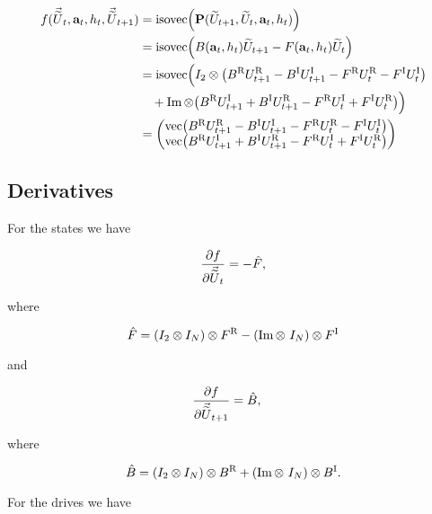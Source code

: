 \documentclass{article}
\newcommand{\isoU}{\widetilde{U}}
\newcommand{\isovecU}{\vec{\widetilde{U}}}
\newcommand{\isovec}{\text{isovec}}
\newcommand{\BR}{B^{\text{R}}}
\newcommand{\BI}{B^{\text{I}}}
\newcommand{\FR}{F^{\text{R}}}
\newcommand{\FI}{F^{\text{I}}}
\newcommand{\UR}{U^{\text{R}}}
\newcommand{\UI}{U^{\text{I}}}
\begin{document}
\begin{align*}
  f(\isovecU_{t}, \vb{a}_t, h_t, \isovecU_{t+1}) &= \isovec\qty(\vb{P}(\isoU_{t+1}, \isoU_t, \vb{a}_t, h_t)) \\ 
  &= \isovec\qty(B(\vb{a}_t, h_t) \isoU_{t+1} - F(\vb{a}_t, h_t) \isoU_t) \\
  &= \isovec\Big(I_2 \otimes \qty(\BR \UR_{t+1} - \BI \UI_{t+1} - \FR \UR_t - \FI \UI_t)\\
  & \quad + \Im \otimes \qty(\BR \UI_{t+1} + \BI \UR_{t+1} - \FR \UI_t + \FI \UR_t)\Big)\\
  &= \mqty( 
    \text{vec}\qty(\BR \UR_{t+1} - \BI \UI_{t+1} - \FR \UR_t - \FI \UI_t) \\ 
    \text{vec}\qty(\BR \UI_{t+1} + \BI \UR_{t+1} - \FR \UI_t + \FI \UR_t)
  )
\end{align*}

\newpage

\subsection{Derivatives}

For the states we have

\begin{align*}
  \pdv{f}{\isovecU_t} &= - \hat F, \\
\end{align*}

where

\begin{equation*}
  \hat F = \qty(I_2 \otimes I_N) \otimes \FR - (\Im \otimes \ I_N) \otimes \FI
\end{equation*}

and

\begin{align*}
  \pdv{f}{\isovecU_{t+1}} &= \hat B,  
\end{align*}

where

\begin{equation*}
  \hat B = \qty(I_2 \otimes I_N) \otimes \BR + (\Im \otimes \ I_N) \otimes \BI.
\end{equation*}


For the drives we have
\end{document}
